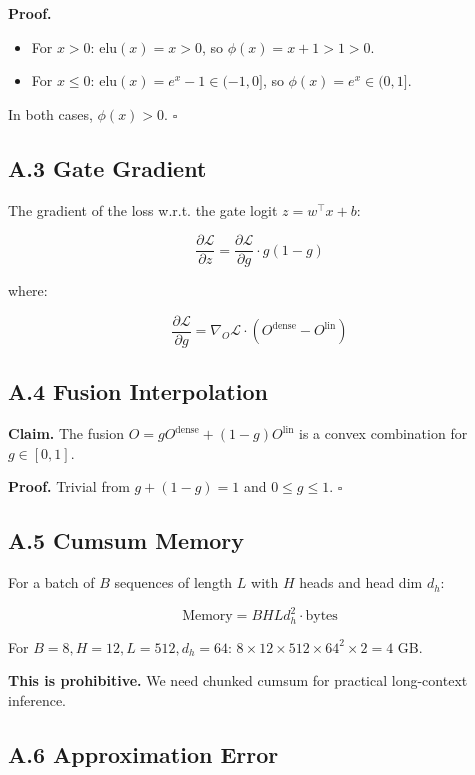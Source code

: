 \textbf{Proof.} 

\begin{itemize}
\item For $x > 0$: $\mathrm{elu}(x) = x > 0$, so $\phi(x) = x + 1 > 1 > 0$.
\item For $x \le 0$: $\mathrm{elu}(x) = e^x - 1 \in (-1, 0]$, so
  $\phi(x) = e^x \in (0, 1]$.

\end{itemize}
In both cases, $\phi(x) > 0$. $\square$

\subsection{A.3 Gate Gradient}

The gradient of the loss w.r.t. the gate logit $z = w^\top x + b$:

\[
\frac{\partial \mathcal{L}}{\partial z} = \frac{\partial \mathcal{L}}{\partial g} \cdot g(1 - g)
\]

where:

\[
\frac{\partial \mathcal{L}}{\partial g} = \nabla_O \mathcal{L} \cdot (O^\text{dense} - O^\text{lin})
\]

\subsection{A.4 Fusion Interpolation}

\textbf{Claim.} The fusion $O = g O^\text{dense} + (1 - g) O^\text{lin}$ is a 
convex combination for $g \in [0, 1]$.

\textbf{Proof.} Trivial from $g + (1 - g) = 1$ and $0 \le g \le 1$. $\square$

\subsection{A.5 Cumsum Memory}

For a batch of $B$ sequences of length $L$ with $H$ heads and head dim $d_h$:

\[
\text{Memory} = B H L d_h^2 \cdot \text{bytes}
\]

For $B = 8, H = 12, L = 512, d_h = 64$: $8 \times 12 \times 512 \times 64^2 \times 2 = 4$ GB. 

\textbf{This is prohibitive.} We need chunked cumsum for practical long-context 
inference.

\subsection{A.6 Approximation Error}

